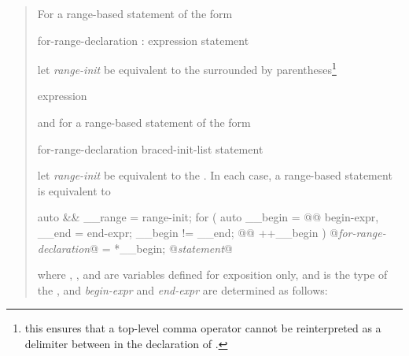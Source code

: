 \begin{quote}
\pnum
For a range-based  statement of the form

\begin{ncbnf}
     \terminal{(} for-range-declaration : expression \terminal{)} statement
\end{ncbnf}

let \textit{range-init} be equivalent to the  surrounded
by parentheses\footnote{this ensures that a top-level comma operator cannot be
  reinterpreted as a delimiter between  in the
  declaration of .}

\begin{ncbnf}
  \terminal{(} expression \terminal{)}
\end{ncbnf}

and for a range-based  statement of the form

\begin{ncbnf}
    \terminal{(} for-range-declaration \terminal{:} braced-init-list \terminal{)} statement
\end{ncbnf}

let \textit{range-init} be equivalent to the . In each case, a
range-based  statement
is equivalent to

\begin{codeblock}
  {
    auto && __range = range-init;
    for ( auto __begin =  @@ begin-expr,
    __end = end-expr;
    __begin != __end;
     @@ ++__begin ) {
      @\textit{for-range-declaration}@ = *__begin;
      @\textit{statement}@
    }
  }
\end{codeblock}

where 
\linebreak
{}, , and  are variables defined for
exposition only, and  is the type of the
, and \textit{begin-expr} and \textit{end-expr} are
determined as follows:


\end{quote}


